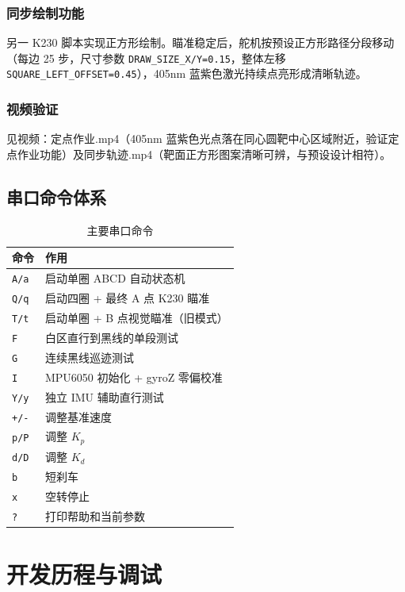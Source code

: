 \documentclass[12pt,a4paper]{ctexart}
\begin{document}
\subsubsection*{同步绘制功能}
另一 K230 脚本实现正方形绘制。瞄准稳定后，舵机按预设正方形路径分段移动（每边 25 步，尺寸参数 \texttt{DRAW\_SIZE\_X/Y=0.15}，整体左移 \texttt{SQUARE\_LEFT\_OFFSET=0.45}），405nm 蓝紫色激光持续点亮形成清晰轨迹。

\subsubsection*{视频验证}
见视频：定点作业.mp4（405nm 蓝紫色光点落在同心圆靶中心区域附近，验证定点作业功能）及同步轨迹.mp4（靶面正方形图案清晰可辨，与预设设计相符）。

\subsection{串口命令体系}
\begin{table}[H]
\centering
\caption{主要串口命令}
\begin{tabular}{@{}ll@{}}
\toprule
\textbf{命令} & \textbf{作用} \\
\midrule
\texttt{A/a} & 启动单圈 ABCD 自动状态机 \\
\texttt{Q/q} & 启动四圈 + 最终 A 点 K230 瞄准 \\
\texttt{T/t} & 启动单圈 + B 点视觉瞄准（旧模式） \\
\texttt{F}   & 白区直行到黑线的单段测试 \\
\texttt{G}   & 连续黑线巡迹测试 \\
\texttt{I}   & MPU6050 初始化 + gyroZ 零偏校准 \\
\texttt{Y/y} & 独立 IMU 辅助直行测试 \\
\texttt{+/-} & 调整基准速度 \\
\texttt{p/P} & 调整 $K_p$ \\
\texttt{d/D} & 调整 $K_d$ \\
\texttt{b}   & 短刹车 \\
\texttt{x}   & 空转停止 \\
\texttt{?}   & 打印帮助和当前参数 \\
\bottomrule
\end{tabular}
\end{table}

\section{开发历程与调试}
\end{document}
